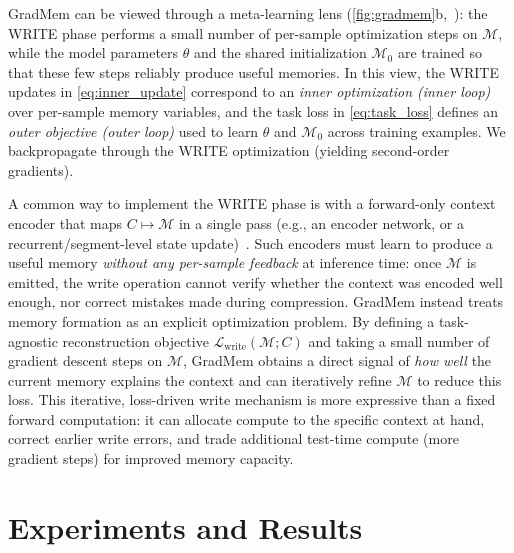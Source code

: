 \documentclass{article}
\theoremstyle{plain}
\theoremstyle{definition}
\theoremstyle{remark}
\begin{document}
{%
GradMem can be viewed through a meta-learning lens (\cref{fig:gradmem}b,~\citet{maml}): the WRITE phase performs a small number of per-sample optimization steps on $\mathcal{M}$, while the model parameters $\theta$ and the shared initialization $\mathcal{M}_0$ are trained so that these few steps reliably produce useful memories.
In this view, the WRITE updates in \cref{eq:inner_update} correspond to an \emph{inner optimization (inner loop)} over per-sample memory variables, and the task loss in \cref{eq:task_loss} defines an \emph{outer objective (outer loop)} used to learn $\theta$ and $\mathcal{M}_0$ across training examples.
We backpropagate through the WRITE optimization (yielding second-order gradients).

A common way to implement the WRITE phase is with a forward-only context encoder that maps $C \mapsto \mathcal{M}$ in a single pass (e.g., an encoder network, or a recurrent/segment-level state update)~\citep{le2014distributed,kiros2015skip,cer2018USE,li2024500xcompressor,gao2024selfcp,rae2019compressive,chevalier2023adapting,behrouz2024titans}. Such encoders must learn to produce a useful memory \emph{without any per-sample feedback} at inference time: once $\mathcal{M}$ is emitted, the write operation cannot verify whether the context was encoded well enough, nor correct mistakes made during compression. GradMem instead treats memory formation as an explicit optimization problem. By defining a task-agnostic reconstruction objective $\mathcal{L}_{\text{write}}(\mathcal{M};C)$ and taking a small number of gradient descent steps on $\mathcal{M}$, GradMem obtains a direct signal of \emph{how well} the current memory explains the context and can iteratively refine $\mathcal{M}$ to reduce this loss. This iterative, loss-driven write mechanism is more expressive than a fixed forward computation: it can allocate compute to the specific context at hand, correct earlier write errors, and trade additional test-time compute (more gradient steps) for improved memory capacity.


\section{Experiments and Results}
\label{sec:experiments}

}
\end{document}
